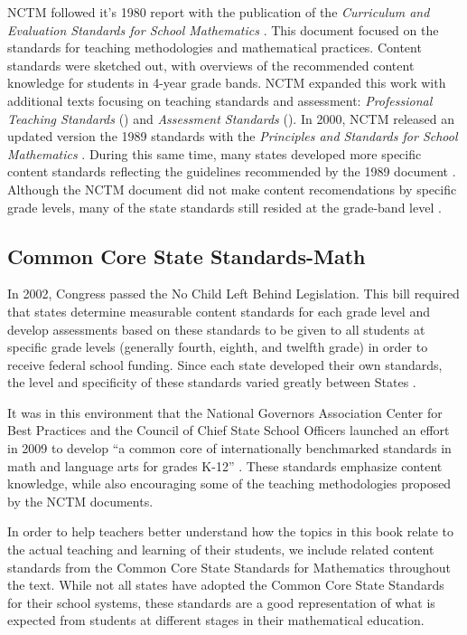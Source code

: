 \documentclass[
]{book}
\theoremstyle{definition}
\theoremstyle{definition}
\theoremstyle{definition}
\theoremstyle{remark}
\begin{document}
NCTM followed it's 1980 report with the publication of the \textit{Curriculum and Evaluation Standards for School Mathematics} \citep{NCTM1989}. This document focused on the standards for teaching methodologies and mathematical practices. Content standards were sketched out, with overviews of the recommended content knowledge for students in 4-year grade bands. NCTM expanded this work with additional texts focusing on teaching standards and assessment: \textit{Professional Teaching Standards} (\citeyear{NCTM1991}) and \textit{Assessment Standards} (\citeyear{NCTM1995}). In 2000, NCTM released an updated version the 1989 standards with the \textit{Principles and Standards for School Mathematics} \citep{PSSM}. During this same time, many states developed more specific content standards reflecting the guidelines recommended by the 1989 document \citep{Raimi1998}. Although the NCTM document did not make content recomendations by specific grade levels, many of the state standards still resided at the grade-band level \citep[p. 677]{Reys2007}.

\hypertarget{common-core-state-standards-math}{%
\subsection{Common Core State Standards-Math}\label{common-core-state-standards-math}}

In 2002, Congress passed the No Child Left Behind Legislation. This bill required that states determine measurable content standards for each grade level and develop assessments based on these standards to be given to all students at specific grade levels (generally fourth, eighth, and twelfth grade) in order to receive federal school funding. Since each state developed their own standards, the level and specificity of these standards varied greatly between States \citep{Reys2007}.

It was in this environment that the National Governors Association Center for Best Practices and the Council of Chief State School Officers launched an effort in 2009 to develop ``a common core of internationally benchmarked standards in math and language arts for grades K-12'' \citep{CCSS}. These standards emphasize content knowledge, while also encouraging some of the teaching methodologies proposed by the NCTM documents.

In order to help teachers better understand how the topics in this book relate to the actual teaching and learning of their students, we include related content standards from the Common Core State Standards for Mathematics throughout the text. While not all states have adopted the Common Core State Standards for their school systems, these standards are a good representation of what is expected from students at different stages in their mathematical education.
\end{document}
